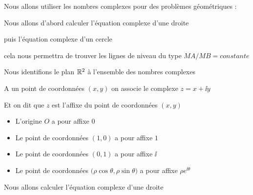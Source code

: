 







\debuttexte


\diapo

\change

Nous allons utiliser les nombres complexes pour des problèmes géométriques :

\change

Nous allons d'abord calculer l'équation complexe d'une droite

\change

puis l'équation complexe d'un cercle

\change

cela nous permettra de trouver les lignes de niveau
du type $MA/MB=constante$


\diapo

Nous identifions le plan $\mathbb{R}^2$ à l'ensemble des nombres complexes

A un point de coordonnées $(x,y)$ on associe le complexe $z=x+\ii y$

Et on dit que $z$ est l'affixe du point de coordonnées $(x,y)$

\change

\begin{itemize}
\item L'origine $O$ a pour affixe $0$

\change

\item Le point de coordonnées $(1,0)$ a pour affixe $1$

\change

\item Le point de coordonnées $(0,1)$ a pour affixe $\ii$

\change

\item Le point de coordonnées $\big(\rho\cos\theta,\rho\sin\theta\big )$ a pour affixe $\rho e^{\ii \theta}$
\end{itemize}


\diapo

Nous allons calculer l'équation complexe d'une droite

